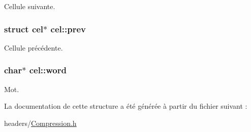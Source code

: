Cellule suivante. 

\hypertarget{structcel_ad3d62b4b68425aa02b5971aecb7b3909}{
\subsubsection[{prev}]{\setlength{\rightskip}{0pt plus 5cm}struct {\bf cel}$\ast$ cel\-::prev}}\label{structcel_ad3d62b4b68425aa02b5971aecb7b3909}


Cellule précédente. 

\hypertarget{structcel_a6aeff9da18be20c9f448699a8ea3d17e}{
\subsubsection[{word}]{\setlength{\rightskip}{0pt plus 5cm}char$\ast$ cel\-::word}}\label{structcel_a6aeff9da18be20c9f448699a8ea3d17e}


Mot. 



La documentation de cette structure a été générée à partir du fichier suivant \-:\begin{DoxyCompactItemize}
\item 
headers/\hyperlink{Compression_8h}{Compression.\-h}\end{DoxyCompactItemize}
